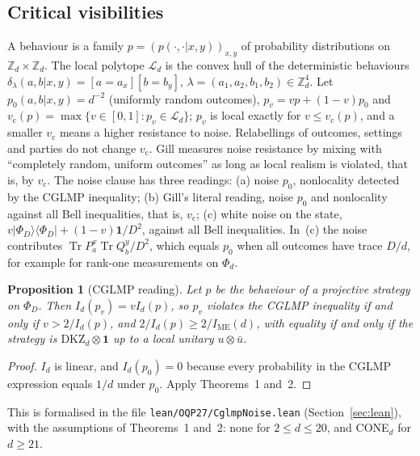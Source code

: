 \documentclass[11pt]{amsart}
\newtheorem{proposition}[theorem]{Proposition}
\theoremstyle{definition}
\theoremstyle{remark}
\numberwithin{equation}{section}
\newcommand{\Z}{\mathbb{Z}}
\newcommand{\Tr}{\operatorname{Tr}}
\newcommand{\one}{\mathbf{1}}
\newcommand{\IME}{I_{\mathrm{ME}}}
\newcommand{\cL}{\mathcal{L}}
\newcommand{\vc}{v_{\mathrm c}}
\newcommand{\DKZ}{\mathrm{DKZ}}
\begin{document}
\subsection{Critical visibilities}
A behaviour is a family $p=(p(\cdot,\cdot|x,y))_{x,y}$ of probability distributions on $\Z_d\times\Z_d$. The local
polytope $\cL_d$ is the convex hull of the deterministic behaviours $\delta_\lambda(a,b|x,y)=[a=a_x][b=b_y]$,
$\lambda=(a_1,a_2,b_1,b_2)\in\Z_d^4$. Let $p_0(a,b|x,y)=d^{-2}$ (uniformly random outcomes), $p_v=vp+(1-v)p_0$ and
$\vc(p)=\max\{v\in[0,1]:p_v\in\cL_d\}$; $p_v$ is local exactly for $v\le\vc(p)$, and a smaller $\vc$ means a higher
resistance to noise. Relabellings of outcomes, settings and parties do not change $\vc$. Gill measures noise resistance
by mixing with ``completely random, uniform outcomes''\cite{Gill} as long as local realism is violated, that is, by
$\vc$. The noise clause has three readings: (a) noise $p_0$, nonlocality detected by the CGLMP inequality; (b) Gill's
literal reading, noise $p_0$ and nonlocality against all Bell inequalities, that is, $\vc$; (c) white noise on the
state, $v|\Phi_D\rangle\langle\Phi_D|+(1-v)\one/D^2$, against all Bell inequalities. In~(c) the noise contributes
$\Tr P^x_a\Tr Q^y_b/D^2$, which equals $p_0$ when all outcomes have trace $D/d$, for example for rank-one measurements
on $\Phi_d$.

\begin{proposition}[CGLMP reading]\label{prop:cglmpnoise}
Let $p$ be the behaviour of a projective strategy on $\Phi_D$. Then $I_d(p_v)=vI_d(p)$, so $p_v$ violates the CGLMP
inequality if and only if $v>2/I_d(p)$, and $2/I_d(p)\ge2/\IME(d)$, with equality if and only if the strategy is
$\DKZ_d\otimes\one$ up to a local unitary $u\otimes\bar u$.
\end{proposition}

\begin{proof}
$I_d$ is linear, and $I_d(p_0)=0$ because every probability in the CGLMP expression equals $1/d$ under $p_0$. Apply
Theorems~1 and~2.
\end{proof}

This is formalised in the file \texttt{lean/OQP27/CglmpNoise.lean} (Section~\ref{sec:lean}), with the assumptions of
Theorems~1 and~2: none for $2\le d\le20$, and CONE$_d$ for $d\ge21$.
\end{document}
